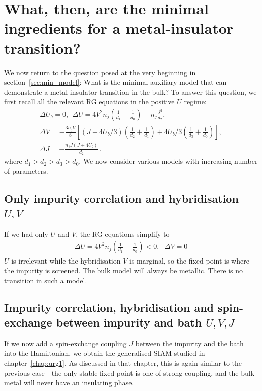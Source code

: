 \documentclass{report}
\numberwithin{equation}{section}
\begin{document}
\section{What, then, are the minimal ingredients for a metal-insulator transition?}
We now return to the question posed at the very beginning in section~\ref{sec:min_model}: What is the minimal auxiliary model that can demonstrate a metal-insulator transition in the bulk? To answer this question, we first recall all the relevant RG equations in the positive \(U\) regime:
\begin{gather}
	\Delta U_b = 0, ~ ~\Delta U = 4V^2 n_j\left(\frac{1}{d_1} - \frac{1}{d_0}\right) - n_j\frac{J^2}{d_2},\\
	\Delta V = -\frac{3n_j V}{8}\left[\left(J + 4U_b/3\right) \left(\frac{1}{d_2} + \frac{1}{d_1}\right) + 4U_b/3\left(\frac{1}{d_3} + \frac{1}{d_0}\right)\right],\\
	\Delta J = -\frac{n_j J\left(J + 4U_b\right)}{d_2}~.
\end{gather}
where \(d_1 > d_2 > d_3 > d_0\).
We now consider various models with increasing number of parameters.

\subsection{Only impurity correlation and hybridisation \(U,V\)}
If we had only \(U\) and \(V\), the RG equations simplify to
\begin{equation}\begin{aligned}
	\Delta U = 4V^2 n_j\left(\frac{1}{d_1} - \frac{1}{d_0}\right) < 0,~ ~ ~\Delta V = 0
\end{aligned}\end{equation}
\(U\) is irrelevant while the hybridisation \(V\) is marginal, so the fixed point is where the impurity is screened. The bulk model will always be metallic. There is no transition in such a model.

\subsection{Impurity correlation, hybridisation and spin-exchange between impurity and bath \(U,V,J\)}
If we now add a spin-exchange coupling \(J\) between the impurity and the bath into the Hamiltonian, we obtain the generalised SIAM studied in chapter~\ref{chap:urg1}. As discussed in that chapter, this is again similar to the previous case - the only stable fixed point is one of strong-coupling, and the bulk metal will never have an insulating phase.
\end{document}
